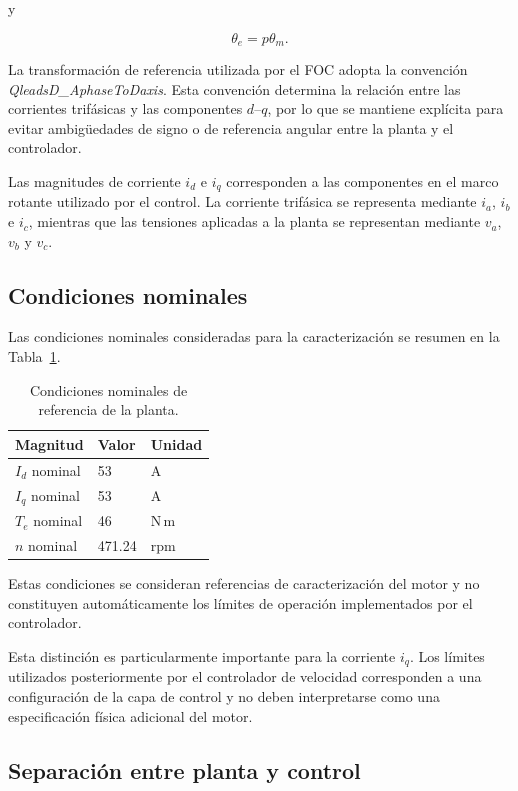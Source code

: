 y

\begin{equation}
\theta_e=p\theta_m.
\end{equation}

La transformación de referencia utilizada por el FOC adopta la convención
\textit{QleadsD\_AphaseToDaxis}. Esta convención determina la relación entre las corrientes trifásicas y las componentes $d$--$q$, por lo que se mantiene explícita para evitar ambigüedades de signo o de referencia angular entre la planta y el controlador.

Las magnitudes de corriente $i_d$ e $i_q$ corresponden a las componentes en el marco rotante utilizado por el control. La corriente trifásica se representa mediante $i_a$, $i_b$ e $i_c$, mientras que las tensiones aplicadas a la planta se representan mediante $v_a$, $v_b$ y $v_c$.

\subsection{Condiciones nominales}

Las condiciones nominales consideradas para la caracterización se resumen en la Tabla~\ref{tab:nominales-m4}.

\begin{table}[H]
\centering
\caption{Condiciones nominales de referencia de la planta.}
\label{tab:nominales-m4}
\begin{tabular}{lll}
\toprule
Magnitud & Valor & Unidad \\
\midrule
$I_d$ nominal & 53 & A \\
$I_q$ nominal & 53 & A \\
$T_e$ nominal & 46 & N\,m \\
$n$ nominal & 471.24 & rpm \\
\bottomrule
\end{tabular}
\end{table}

Estas condiciones se consideran referencias de caracterización del motor y no constituyen automáticamente los límites de operación implementados por el controlador.

Esta distinción es particularmente importante para la corriente $i_q$. Los límites utilizados posteriormente por el controlador de velocidad corresponden a una configuración de la capa de control y no deben interpretarse como una especificación física adicional del motor.

\subsection{Separación entre planta y control}


